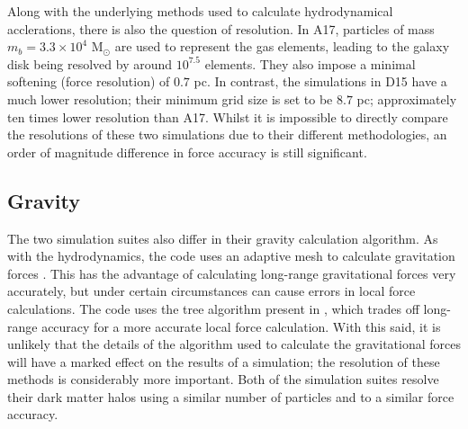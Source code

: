 Along with the underlying methods used to calculate hydrodynamical
acclerations, there is also the question of resolution. In A17, particles of
mass $m_b = 3.3\times10^4$ M$_\odot$ are used to represent the gas elements,
leading to the galaxy disk being resolved by around $10^{7.5}$ elements. They
also impose a minimal softening (force resolution) of $0.7$ pc. In contrast,
the simulations in D15 have a much lower resolution; their minimum grid size is
set to be $8.7$ pc; approximately ten times lower resolution than A17. Whilst
it is impossible to directly compare the resolutions of these two simulations
due to their different methodologies, an order of magnitude difference in force
accuracy is still significant.

\subsection{Gravity}

The two simulation suites also differ in their gravity calculation algorithm.
As with the hydrodynamics, the \hagn{} code uses an adaptive mesh to calculate
gravitation forces \citep[a `particle-mesh' method, based
on][]{kravtsov_adaptive_1997}. This has the advantage of calculating long-range
gravitational forces very accurately, but under certain circumstances can cause
errors in local force calculations. The \fire{} code uses the tree algorithm
present in \citet{springel_cosmological_2005}, which trades off long-range
accuracy for a more accurate local force calculation. With this said, it is
unlikely that the details of the algorithm used to calculate the gravitational
forces will have a marked effect on the results of a simulation; the resolution
of these methods is considerably more important. Both of the simulation suites
resolve their dark matter halos using a similar number of particles and to a
similar force accuracy.

\renewcommand{\arraystretch}{2}

